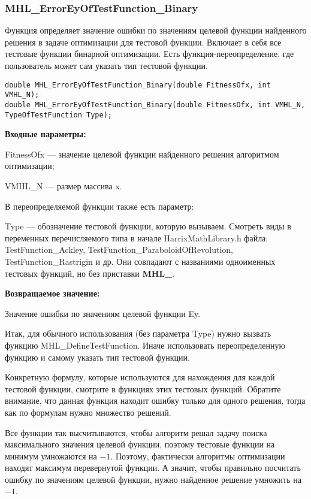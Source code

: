 \documentclass[a4paper,12pt]{article}
\begin{document}
\subsubsection{MHL\_ErrorEyOfTestFunction\_Binary}\label{MHL_ErrorEyOfTestFunction_Binary}

Функция определяет значение ошибки по значениям целевой функции найденного решения в задаче оптимизации для тестовой функции. Включает в себя все тестовые функции бинарной оптимизации. Есть функция-переопределение, где пользователь может сам указать тип тестовой функции.


\begin{lstlisting}[label=code_syntax_MHL_ErrorEyOfTestFunction_Binary,caption=Синтаксис]
double MHL_ErrorEyOfTestFunction_Binary(double FitnessOfx, int VMHL_N);
double MHL_ErrorEyOfTestFunction_Binary(double FitnessOfx, int VMHL_N, TypeOfTestFunction Type);
\end{lstlisting}

\textbf{Входные параметры:}

FitnessOfx --- значение целевой функции найденного решения алгоритмом оптимизации;

VMHL\_N --- размер массива x.

В переопределяемой функции также есть параметр:
  
Type --- обозначение тестовой функции, которую вызываем.
Смотреть виды в переменных перечисляемого типа в начале HarrixMathLibrary.h файла: TestFunction\_Ackley, TestFunction\_ParaboloidOfRevolution, TestFunction\_Rastrigin и др. Они совпадают с названиями одноименных тестовых функций, но без приставки \textbf{MHL\_}.

\textbf{Возвращаемое значение:}
 
Значение ошибки по значениям целевой функции Ey.

Итак, для обычного использования (без параметра Type) нужно вызвать функцию MHL\_DefineTestFunction. Иначе использовать переопределенную функцию и самому указать тип тестовой функции.

Конкретную формулу, которые используются для нахождения для каждой тестовой функции, смотрите в функциях этих тестовых функций. Обратите внимание, что данная функция находит ошибку только для одного решения, тогда как по формулам нужно множество решений.

Все функции так высчитываются, чтобы алгоритм решал задачу поиска максимального значения целевой функции, поэтому тестовые функции на минимум умножаются на $-1$. Поэтому, фактически алгоритмы оптимизации находят максимум перевернутой функции. А значит, чтобы правильно посчитать ошибку по значениям целевой функции, нужно найденное решение умножить на $-1$.
\end{document}
